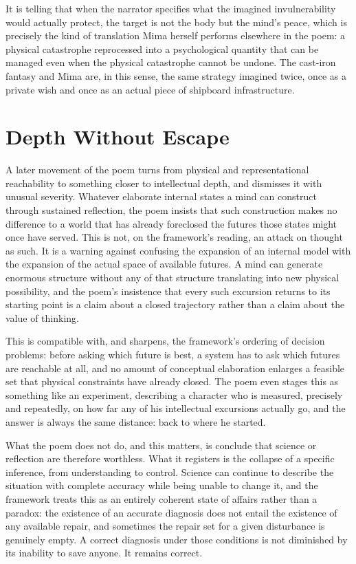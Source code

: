 \documentclass[11pt]{article}
\begin{document}
It is telling that when the narrator specifies what the imagined invulnerability would actually protect, the target is not the body but the mind's peace, which is precisely the kind of translation Mima herself performs elsewhere in the poem: a physical catastrophe reprocessed into a psychological quantity that can be managed even when the physical catastrophe cannot be undone. The cast-iron fantasy and Mima are, in this sense, the same strategy imagined twice, once as a private wish and once as an actual piece of shipboard infrastructure.

\section{Depth Without Escape}

A later movement of the poem turns from physical and representational reachability to something closer to intellectual depth, and dismisses it with unusual severity. Whatever elaborate internal states a mind can construct through sustained reflection, the poem insists that such construction makes no difference to a world that has already foreclosed the futures those states might once have served. This is not, on the framework's reading, an attack on thought as such. It is a warning against confusing the expansion of an internal model with the expansion of the actual space of available futures. A mind can generate enormous structure without any of that structure translating into new physical possibility, and the poem's insistence that every such excursion returns to its starting point is a claim about a closed trajectory rather than a claim about the value of thinking.

This is compatible with, and sharpens, the framework's ordering of decision problems: before asking which future is best, a system has to ask which futures are reachable at all, and no amount of conceptual elaboration enlarges a feasible set that physical constraints have already closed. The poem even stages this as something like an experiment, describing a character who is measured, precisely and repeatedly, on how far any of his intellectual excursions actually go, and the answer is always the same distance: back to where he started.

What the poem does not do, and this matters, is conclude that science or reflection are therefore worthless. What it registers is the collapse of a specific inference, from understanding to control. Science can continue to describe the situation with complete accuracy while being unable to change it, and the framework treats this as an entirely coherent state of affairs rather than a paradox: the existence of an accurate diagnosis does not entail the existence of any available repair, and sometimes the repair set for a given disturbance is genuinely empty. A correct diagnosis under those conditions is not diminished by its inability to save anyone. It remains correct.
\end{document}
